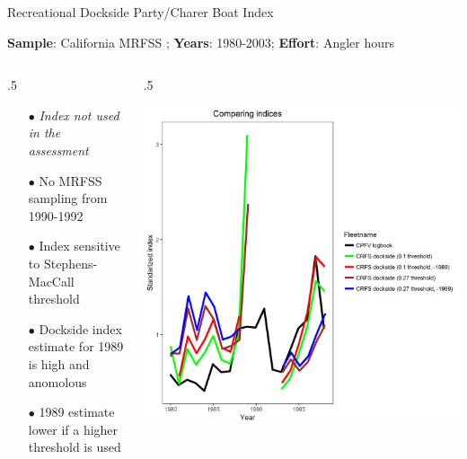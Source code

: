 \documentclass[ignorenonframetext,compress]{beamer}
\def\begincols{\begin{columns}}
\def\begincol{\begin{column}}
\def\endcol{\end{column}}
\def\endcols{\end{columns}}
\begin{document}
\begin{frame}{Recreational Dockside Party/Charer Boat Index}

\textbf{Sample}: California MRFSS ; \textbf{Years}: 1980-2003;
\textbf{Effort}: Angler hours

\begincols
 \begincol{.5\textwidth}

\begin{itemize}
\item[$\bullet$] \emph{Index not used in the assessment}
\item[$\bullet$] No MRFSS sampling from 1990-1992
\item[$\bullet$] Index sensitive to Stephens-MacCall threshold
\item[$\bullet$] Dockside index estimate for 1989 is high and anomolous
\item[$\bullet$] 1989 estimate lower if a higher threshold is used
\end{itemize}

\endcol
 \begincol{.5\textwidth}

\includegraphics{Figures/Fleet5_RecPC_dockside_index_compare.png}

\endcol
\endcols

\end{frame}
\end{document}
